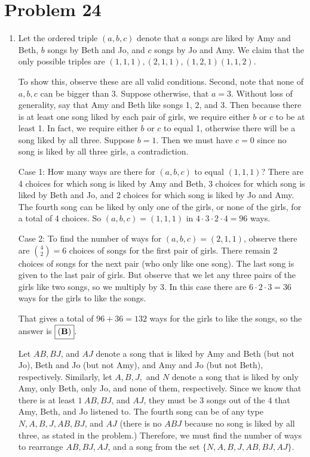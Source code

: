 \documentclass{article}%
\begin{document}
\section*{Problem 24}%
\label{sec:Problem24}%
\begin{enumerate}%
\item%
Let the ordered triple $(a,b,c)$ denote that $a$ songs are liked by Amy and Beth, $b$ songs by Beth and Jo, and $c$ songs by Jo and Amy. We claim that the only possible triples are $(1,1,1), (2,1,1), (1,2,1)(1,1,2)$. 

To show this, observe these are all valid conditions. Second, note that none of $a,b,c$ can be bigger than 3. Suppose otherwise, that $a = 3$. Without loss of generality, say that Amy and Beth like songs 1, 2, and 3. Then because there is at least one song liked by each pair of girls, we require either $b$ or $c$ to be at least 1. In fact, we require either $b$ or $c$ to equal 1, otherwise there will be a song liked by all three. Suppose $b = 1$. Then we must have $c=0$ since no song is liked by all three girls, a contradiction.

Case 1: How many ways are there for $(a,b,c)$ to equal $(1,1,1)$? There are 4 choices for which song is liked by Amy and Beth, 3 choices for which song is liked by Beth and Jo, and 2 choices for which song is liked by Jo and Amy. The fourth song can be liked by only one of the girls, or none of the girls, for a total of 4 choices. So $(a,b,c)=(1,1,1)$ in $4\cdot3\cdot2\cdot4 = 96$ ways.

Case 2: To find the number of ways for $(a,b,c) = (2,1,1)$, observe there are $\binom{4}{2} = 6$ choices of songs for the first pair of girls. There remain 2 choices of songs for the next pair (who only like one song). The last song is given to the last pair of girls. But observe that we let any three pairs of the girls like two songs, so we multiply by 3. In this case there are $6\cdot2\cdot3=36$ ways for the girls to like the songs.

That gives a total of $96 + 36 = 132$ ways for the girls to like the songs, so the answer is $\boxed{(\textrm{\textbf{B}})}$.

Let $AB, BJ$, and $AJ$ denote a song that is liked by Amy and Beth (but not Jo), Beth and Jo (but not Amy), and Amy and Jo (but not Beth), respectively. Similarly, let $A, B, J,$ and $N$ denote a song that is liked by only Amy, only Beth, only Jo, and none of them, respectively. Since we know that there is at least $1\: AB, BJ$, and $AJ$, they must be $3$ songs out of the $4$ that Amy, Beth, and Jo listened to. The fourth song can be of any type $N, A, B, J, AB, BJ$, and $AJ$ (there is no $ABJ$ because no song is liked by all three, as stated in the problem.) Therefore, we must find the number of ways to rearrange $AB, BJ, AJ$, and a song from the set $\{N, A, B, J, AB, BJ, AJ\}$.


\end{enumerate}
\end{document}
